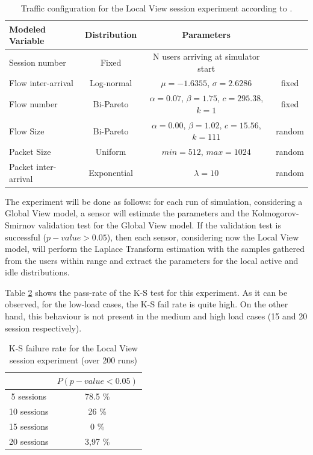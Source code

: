 \begin{table}[h!]
	\begin{center}
		\begin{tabular}{ l | c | c | c }
			Modeled Variable & Distribution & Parameters & \\ \hline
			Session number	& Fixed & N users arriving at simulator start \\
			Flow inter-arrival & Log-normal & $\mu = -1.6355$, $\sigma = 2.6286$ & fixed\\
			Flow number & Bi-Pareto & $\alpha = 0.07$, $\beta = 1.75$, $c = 295.38$, $k = 1$ & fixed\\
			Flow Size & Bi-Pareto & $\alpha = 0.00$, $\beta = 1.02$, $c = 15.56$, $k = 111$ & random\\
			Packet Size & Uniform & $min = 512$, $max = 1024$ & random\\
			Packet inter-arrival & Exponential & $\lambda = 10$ & random\\
		\end{tabular}
		\caption{Traffic configuration for the Local View session experiment according to \cite{Campus-WLAN}.}
		\label{table:lv_traffic}
	\end{center}
\end{table}

The experiment will be done as follows: for each run of simulation, considering a Global View model, a sensor will estimate the parameters and the Kolmogorov-Smirnov validation test for the Global View model. If the validation test is successful ($p-value > 0.05$), then each sensor, considering now the Local View model, will perform the Laplace Transform estimation with the samples gathered from the users within range and extract the parameters for the local active and idle distributions.

Table \ref{table:lv_session_exp_ks} shows the pass-rate of the \acs{K-S} test for this experiment. As it can be observed, for the low-load cases, the \acs{K-S} fail rate is quite high. On the other hand, this behaviour is not present in the medium and high load cases (15 and 20 session respectively).

\begin{table}[h!]
	\centering
	\begin{tabular}{ c | c }
		& $P(p-value < 0.05)$ \\ \hline
		5 sessions &  78.5 \%\\ 
		10 sessions & 26 \% \\
		15 sessions & 0 \% \\
		20 sessions & 3,97 \%
	\end{tabular}
	\caption{\acs{K-S} failure rate for the Local View session experiment (over 200 runs)}
	\label{table:lv_session_exp_ks}
\end{table}

